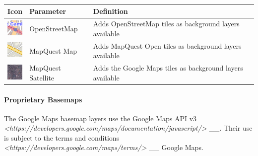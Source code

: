 \documentclass[letterpaper,10pt,english]{sphinxmanual}
\begin{document}
\begin{tabulary}{\linewidth}{|L|L|L|}
\hline

\textbf{Icon}
 & 
\textbf{Parameter}
 & 
\textbf{Definition}
\\
\hline
\includegraphics{osm-layer-icon.png}
 & 
OpenStreetMap
 & 
Adds OpenStreetMap tiles as background layers available
\\
\hline
\includegraphics{mqstr-layer-icon.png}
 & 
MapQuest Map
 & 
Adds MapQuest Open tiles as background layers available
\\
\hline
\includegraphics{mqsat-layer-icon.png}
 & 
MapQuest Satellite
 & 
Adds the Google Maps tiles as background layers available
\\
\hline\end{tabulary}

\paragraph{Proprietary Basemaps}

The Google Maps basemap layers use the Google Maps API v3 \emph{\textless{}https://developers.google.com/maps/documentation/javascript/\textgreater{}} \_\_. Their use is subject to the terms and conditions \emph{\textless{}https://developers.google.com/maps/terms/\textgreater{}} \_\_ Google Maps.
\end{document}
